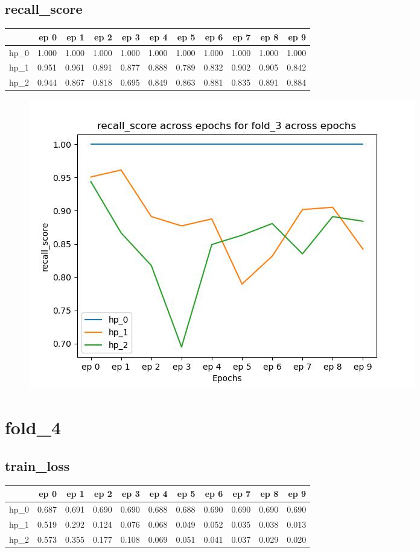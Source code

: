 \documentclass{article}
\begin{document}
\subsection{recall\_score}
\begin{tabular}{lrrrrrrrrrr}
\toprule
{} &   ep 0 &   ep 1 &   ep 2 &   ep 3 &   ep 4 &   ep 5 &   ep 6 &   ep 7 &   ep 8 &   ep 9 \\
\midrule
hp\_0 &  1.000 &  1.000 &  1.000 &  1.000 &  1.000 &  1.000 &  1.000 &  1.000 &  1.000 &  1.000 \\
hp\_1 &  0.951 &  0.961 &  0.891 &  0.877 &  0.888 &  0.789 &  0.832 &  0.902 &  0.905 &  0.842 \\
hp\_2 &  0.944 &  0.867 &  0.818 &  0.695 &  0.849 &  0.863 &  0.881 &  0.835 &  0.891 &  0.884 \\
\bottomrule
\end{tabular}

\begin{figure}[H]
\includegraphics[scale = 0.75]{fold_3/recall_score}
\end{figure}
\section{fold\_4}
\subsection{train\_loss}
\begin{tabular}{lrrrrrrrrrr}
\toprule
{} &   ep 0 &   ep 1 &   ep 2 &   ep 3 &   ep 4 &   ep 5 &   ep 6 &   ep 7 &   ep 8 &   ep 9 \\
\midrule
hp\_0 &  0.687 &  0.691 &  0.690 &  0.690 &  0.688 &  0.688 &  0.690 &  0.690 &  0.690 &  0.690 \\
hp\_1 &  0.519 &  0.292 &  0.124 &  0.076 &  0.068 &  0.049 &  0.052 &  0.035 &  0.038 &  0.013 \\
hp\_2 &  0.573 &  0.355 &  0.177 &  0.108 &  0.069 &  0.051 &  0.041 &  0.037 &  0.029 &  0.020 \\
\bottomrule
\end{tabular}
\end{document}
